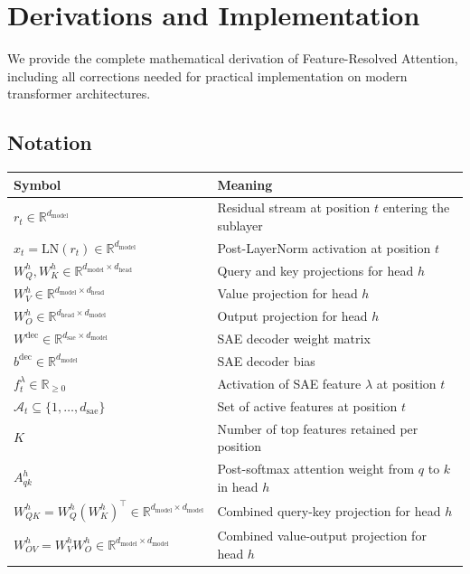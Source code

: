 \documentclass{article}
\theoremstyle{plain}
\theoremstyle{definition}
\theoremstyle{remark}
\newcommand{\Wdec}{W^{\mathrm{dec}}}
\newcommand{\WQ}{W_Q}
\newcommand{\WK}{W_K}
\newcommand{\WV}{W_V}
\newcommand{\WO}{W_O}
\newcommand{\WOV}{W_{OV}}
\newcommand{\WQK}{W_{QK}}
\newcommand{\dmodel}{d_{\mathrm{model}}}
\newcommand{\dhead}{d_{\mathrm{head}}}
\newcommand{\dsae}{d_{\mathrm{sae}}}
\newcommand{\RR}{\mathbb{R}}
\begin{document}



\newpage
\appendix
\onecolumn
\section{Derivations and Implementation}
\label{app:derivations}

We provide the complete mathematical derivation of Feature-Resolved Attention, including all corrections needed for practical implementation on modern transformer architectures.

\subsection{Notation}

\begin{table}[h]
\centering
\begin{tabular}{ll}
\toprule
Symbol & Meaning \\
\midrule
$r_t \in \RR^{\dmodel}$ & Residual stream at position $t$ entering the sublayer \\
$x_t = \mathrm{LN}(r_t) \in \RR^{\dmodel}$ & Post-LayerNorm activation at position $t$ \\
$W_{Q}^h, W_{K}^h \in \RR^{\dmodel \times \dhead}$ & Query and key projections for head $h$ \\
$W_{V}^h \in \RR^{\dmodel \times \dhead}$ & Value projection for head $h$ \\
$W_{O}^h \in \RR^{\dhead \times \dmodel}$ & Output projection for head $h$ \\
$\Wdec \in \RR^{\dsae \times \dmodel}$ & SAE decoder weight matrix \\
$b^{\mathrm{dec}} \in \RR^{\dmodel}$ & SAE decoder bias \\
$f^\lambda_t \in \RR_{\geq 0}$ & Activation of SAE feature $\lambda$ at position $t$ \\
$\mathcal{A}_t \subseteq \{1, \ldots, \dsae\}$ & Set of active features at position $t$ \\
$K$ & Number of top features retained per position \\
$A^h_{qk}$ & Post-softmax attention weight from $q$ to $k$ in head $h$ \\
$\WQK^h = \WQ^h (\WK^h)^\top \in \RR^{\dmodel \times \dmodel}$ & Combined query-key projection for head $h$ \\
$\WOV^h = \WV^h \WO^h \in \RR^{\dmodel \times \dmodel}$ & Combined value-output projection for head $h$ \\
\bottomrule
\end{tabular}
\end{table}
\end{document}
